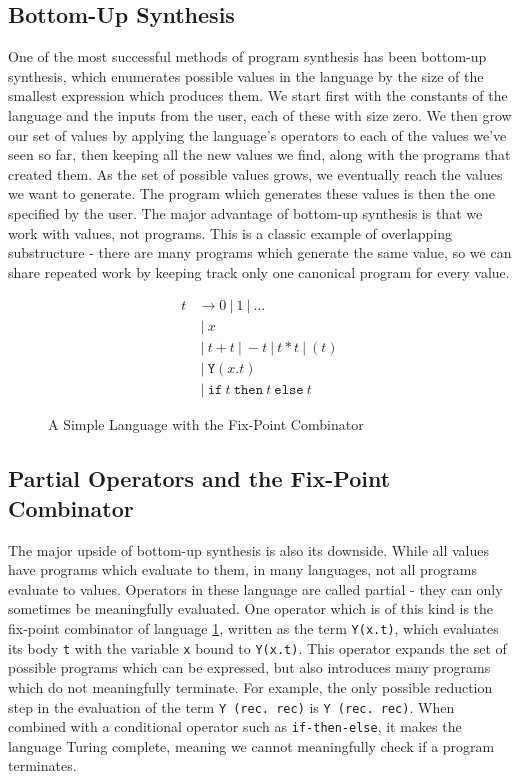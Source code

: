 \documentclass[acmsmall,screen]{acmart}
\begin{document}
\subsection{Bottom-Up Synthesis}

One of the most successful methods of program synthesis has been bottom-up synthesis, which enumerates possible values in the language by the size of the smallest expression which produces them. We start first with the constants of the language and the inputs from the user, each of these with size zero. We then grow our set of values by applying the language's operators to each of the values we've seen so far, then keeping all the new values we find, along with the programs that created them. As the set of possible values grows, we eventually reach the values we want to generate. The program which generates these values is then the one specified by the user. The major advantage of bottom-up synthesis is that we work with values, not programs. This is a classic example of overlapping substructure - there are many programs which generate the same value, so we can share repeated work by keeping track only one canonical program for every value.

\newcommand*\OR{\ |\ }

\begin{figure}[h]
\begin{align*}
  t & \to 0 \OR 1 \OR ... \\
    & \OR x \\
    & \OR t + t \OR - t \OR t * t \OR ( t ) \\
    & \OR \texttt{Y}(x. t) \\
    & \OR \texttt{if} \ t\ \texttt{then}\ t\ \texttt{else} \ t\
\end{align*}
\caption{A Simple Language with the Fix-Point Combinator}
\label{fig:mathWithRec}
\end{figure}

\subsection{Partial Operators and the Fix-Point Combinator}

The major upside of bottom-up synthesis is also its downside. While all values have programs which evaluate to them, in many languages, not all programs evaluate to values. Operators in these language are called partial - they can only sometimes be meaningfully evaluated. One operator which is of this kind is the fix-point combinator of language \ref{fig:mathWithRec}, written as the term \verb|Y(x.t)|, which evaluates its body \verb|t| with the variable \verb|x| bound to \verb|Y(x.t)|. This operator expands the set of possible programs which can be expressed, but also introduces many programs which do not meaningfully terminate. For example, the only possible reduction step in the evaluation of the term \verb|Y (rec. rec)| is \verb|Y (rec. rec)|. When combined with a conditional operator such as \verb|if-then-else|, it makes the language Turing complete, meaning we cannot meaningfully check if a program terminates.
\end{document}
